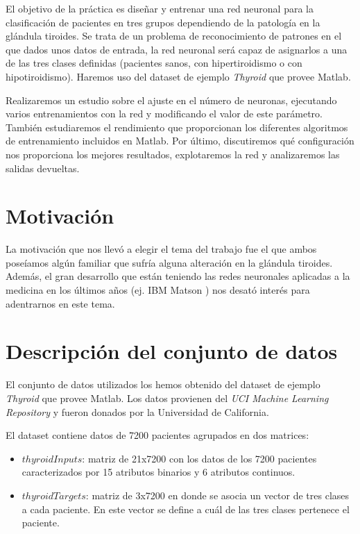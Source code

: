 \documentclass[a4paper,12pt,titlepage]{article}
\begin{document}
El objetivo de la práctica es diseñar y entrenar una red neuronal para la clasificación de pacientes en tres grupos dependiendo de la patología en la glándula tiroides. Se trata de un problema de reconocimiento de patrones en el que dados unos datos de entrada, la red neuronal será capaz de asignarlos a una de las tres clases definidas (pacientes sanos, con hipertiroidismo o con hipotiroidismo). Haremos uso del dataset de ejemplo \emph{Thyroid} que provee Matlab.

Realizaremos un estudio sobre el ajuste en el número de neuronas, ejecutando varios entrenamientos con la red y modificando el valor de este parámetro. También estudiaremos el rendimiento que proporcionan los diferentes algoritmos de entrenamiento  incluidos en Matlab. Por último, discutiremos qué configuración nos proporciona los mejores resultados, explotaremos la red y analizaremos las salidas devueltas.

\section{Motivación}

La motivación que nos llevó a elegir el tema del trabajo fue el que ambos poseíamos algún familiar que sufría alguna alteración en la glándula tiroides. Además, el gran desarrollo que están teniendo las redes neuronales aplicadas a la medicina en los últimos años (ej. IBM Matson \citep{wiki:watson}) nos desató interés para adentrarnos en este tema.

\section{Descripción del conjunto de datos}

El conjunto de datos utilizados los hemos obtenido del dataset de ejemplo \emph{Thyroid} que provee Matlab. Los datos provienen del \emph{UCI Machine Learning Repository} \citep{Asuncion+Newman:2007} y fueron donados por la Universidad de California.

El dataset contiene datos de 7200 pacientes agrupados en dos matrices:

\begin{itemize}[noitemsep]
	\item $thyroidInputs$: matriz de 21x7200 con los datos de los 7200 pacientes caracterizados por 15 atributos binarios y 6 atributos continuos.
	\item $thyroidTargets$: matriz de 3x7200 en donde se asocia un vector de tres clases a cada paciente. En este vector se define a cuál de las tres clases pertenece el paciente.
\end{itemize}
\end{document}
